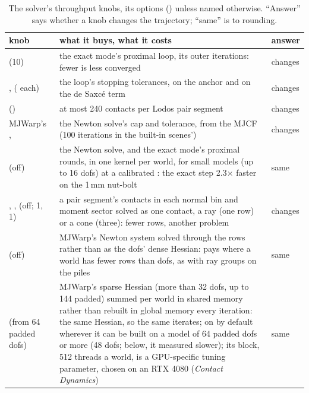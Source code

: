 \begin{table}[t]
\centering
\caption{The solver's throughput knobs, its options () unless named otherwise. ``Answer'' says whether a knob changes the trajectory; ``same'' is to rounding.}
\label{tab:solverknobs}
\small
\begin{tabularx}{\linewidth}{@{}L{38mm}YL{13mm}@{}}
\toprule
knob & what it buys, what it costs & answer \\
\midrule
{} (10) & the exact mode's proximal loop, its outer iterations: fewer is less converged & changes \\
,  ( each) & the loop's stopping tolerances, on the anchor and on the de Saxc\'e term & changes \\
 () & at most 240 contacts per Lodos pair segment & changes \\
MJWarp's ,  & the Newton solve's cap and tolerance, from the MJCF (100 iterations in the built-in scenes') & changes \\
 (off) & the Newton solve, and the exact mode's proximal rounds, in one kernel per world, for small models (up to 16 dofs) at a calibrated : the exact step 2.3$\times$ faster on the 1\,mm nut-bolt & same \\
, ,  (off; 1, 1) & a pair segment's contacts in each normal bin and moment sector solved as one contact, a ray (one row) or a cone (three): fewer rows, another problem & changes \\
 (off) & MJWarp's Newton system solved through the rows rather than as the dofs' dense Hessian: pays where a world has fewer rows than dofs, as with ray groups on the piles & same \\
 (from 64 padded dofs) & MJWarp's sparse Hessian (more than 32 dofs, up to 144 padded) summed per world in shared memory rather than rebuilt in global memory every iteration: the same Hessian, so the same iterates; on by default wherever it can be built on a model of 64 padded dofs or more (48 dofs; below, it measured slower); its block, 512 threads a world, is a GPU-specific tuning parameter, chosen on an RTX 4080 (\emph{Contact Dynamics}) & same \\
\bottomrule
\end{tabularx}
\end{table}


